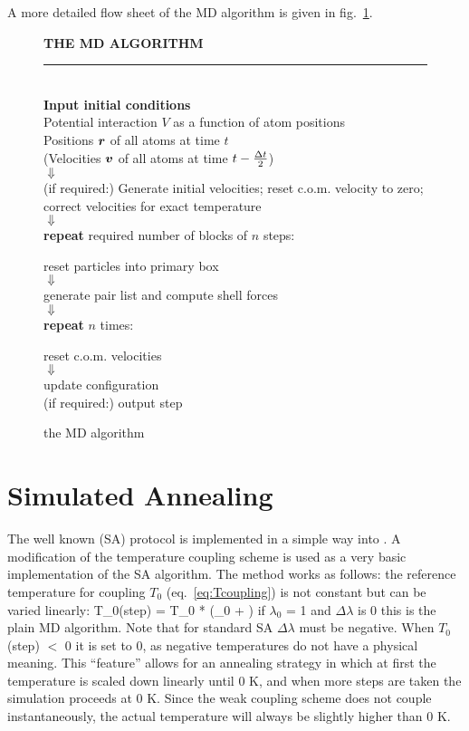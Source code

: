 A more detailed flow sheet of the MD algorithm is given in
fig.~\ref{fig:flowdetail}. 

\begin{figure}
\begin{center}
\addtolength{\fboxsep}{0.5cm}
\begin{shadowenv}[12cm]
{\large \bf THE MD ALGORITHM}
\rule{\textwidth}{2pt} \\
{\bf Input initial conditions} \\[2ex]
Potential interaction $V$ as a function of atom positions \\
Positions $\mbox{\boldmath ${r}$}$ of all atoms at time $t$ \\
(Velocities $\mbox{\boldmath ${v}$}$ of all atoms at time $t-{\frac {\Delta t}{2}}$) \\
$\Downarrow$ \\
(if required:) Generate initial velocities; reset c.o.m. velocity to
zero; correct velocities for exact temperature \\
$\Downarrow$ \\
{\bf repeat} required number of blocks of $n$ steps:
\begin{shadowenv}[10cm]
reset particles into primary box \\
$\Downarrow$ \\
generate pair list and compute shell forces\\
$\Downarrow$ \\
{\bf repeat} $n$ times:
\begin{shadowenv}[8cm]
reset c.o.m. velocities \\
$\Downarrow$ \\
update configuration \\
(if required:) output step
\end{shadowenv}
\end{shadowenv}
\end{shadowenv}
\caption{the MD algorithm}
\label{fig:flowdetail}
\end{center}  
\end{figure}

\section{Simulated Annealing}
\label{sec:SA}
The well known 
(SA) protocol is implemented
in a simple way into {\gromacs}. A modification of the temperature coupling
scheme is used as a very basic implementation of the SA algorithm. The
method works as follows: the reference temperature for coupling $T_0$
(eq.~\ref{eq:Tcoupling})
is not constant but can be varied linearly:
\beq
T_0({\rm step}) = T_0 * (\lambda_0 + \Delta{})
\label{eq:SA}
\eeq
if $\lambda_0$ = 1 and $\Delta\lambda$ is 0 this is the plain MD
algorithm. Note that for standard SA $\Delta\lambda$  must be negative.
When $T_0$(step) $<$ 0 it is set to 0, as negative temperatures do not have
a physical meaning. This ``feature'' 
allows for an annealing strategy in which
at first the temperature is scaled down linearly until 0 K, 
and when more steps
are taken the simulation proceeds at 0 K. Since the weak coupling scheme
does not couple instantaneously, the actual temperature will
always be slightly higher than 0 K.

